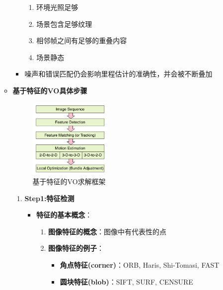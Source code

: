 \documentclass[../main.tex]{subfiles}
\begin{document}
\begin{enumerate}
\begin{itemize}
\begin{itemize}
\begin{enumerate}
                            \item 环境光照足够
                            \item 场景包含足够纹理
                            \item 相邻帧之间有足够的重叠内容
                            \item 场景静态
                        \end{enumerate}
                    \item 噪声和错误匹配仍会影响里程估计的准确性，并会被不断叠加
                \end{itemize}            
            \item \textbf{基于特征的VO具体步骤}
                    \begin{figure}[H]
                        \centering
                        \includegraphics[width=0.4\textwidth]{images/vo_structure.png}
                        \caption{基于特征的VO求解框架}
                    \end{figure}
                \begin{enumerate}
                    \item \textbf{Step1:特征检测}
                        \begin{itemize}
                            \item \textbf{特征的基本概念}：
                                \begin{enumerate}
                                    \item \textbf{图像特征的概念}：图像中有代表性的点
                                    \item \textbf{图像特征的例子}：
                                        \begin{itemize}
                                            \item \textbf{角点特征(corner)}：ORB, Haris, Shi-Tomasi, FAST
                                            \item \textbf{圆块特征(blob)}：SIFT, SURF, CENSURE

\end{itemize}
\end{enumerate}
\end{itemize}
\end{enumerate}
\end{itemize}
\end{enumerate}
\end{document}
